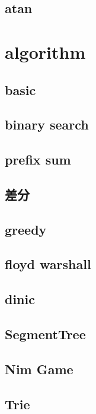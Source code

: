         \subsection{atan}
            

\section{algorithm}
    \subsection{basic}
        
    \subsection{binary search}
        
    \subsection{prefix sum}
        
    \subsection{差分}
        
    \subsection{greedy}
        
    \subsection{floyd warshall}
        
    \subsection{dinic}
        
    \subsection{SegmentTree}
        
    \subsection{Nim Game}
        
    \subsection{Trie}
        
